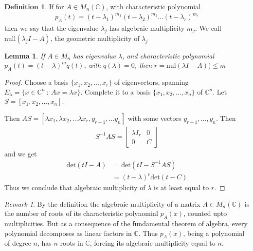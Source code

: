 \documentclass[12pt]{article}
\newtheorem{lemma}[thm]{Lemma}
\theoremstyle{definition}
\newtheorem{defn}[thm]{Definition}
\theoremstyle{remark}
\newtheorem{rem}[thm]{Remark}
\begin{document}
\begin{defn}
  If for $A \in M_n(\mathbb{C})$, with characteristic polynomial
  \begin{align*}
    p_A(t) = (t - \lambda_1)^{m_1} ( t - \lambda_2)^{m_2} \ldots (t -
    \lambda_r)^{m_r}
  \end{align*}
  then we say that the eigenvalue $\lambda_j$ has algebraic
  multiplicity $m_j$. We call $\textrm{null}(\lambda_jI - A)$, the
  geometric multiplicity of $\lambda_j$
\end{defn}

\begin{lemma}
  If $A \in M_n$ has eigenvalue $\lambda$, and characteristic
  polynomial $ p_A(t) = (t - \lambda)^m q(t)$, with $q(\lambda) = 0$,
then $r = \textrm{nul}(\lambda I - A)) \le m$
\end{lemma}
\begin{proof}
Choose a basis $\{ x_1 , x_2 , \ldots , x_r \}$ of eigenvectors,
spanning $E_\lambda = \{ x \in \mathbb{C}^n \ : \ Ax = \lambda x \}$.
Complete it to a basis $\{ x_1 , x_2 , \ldots , x_n \}$ of $
\mathbb{C}^n$. Let $S = [x_1 , x_2 , \ldots , x_n]$.

Then $AS = [ \lambda x_1 , \lambda x_2 , \ldots  \lambda x_r,
y_{r+1}, \ldots y_n]$ with some vectors $y_{r+1} , \ldots , y_n$.
Then
\begin{align*}
  S^{-1}AS =
  \begin{bmatrix}
    \lambda I_r & 0 \\
    0 & C
  \end{bmatrix}
\end{align*}
and we get
\begin{align*}
  \textrm{det}(tI - A) & = \textrm{det}(tI - S^{-1}AS) \\
  &= ( t - \lambda)^r \textrm{det}(t - C)
\end{align*}
Thus we conclude that algebraic multiplicity of $\lambda$ is at least
equal to $r$.
\end{proof}

\begin{rem}
By the definition the algebraic multiplicity of a matrix $A \in
M_n(\mathbb{C})$ is the number of roots of its characteristic
polynomial $p_A(x)$, counted upto multiplicities. But as a
consequence of the fundamental theorem of algebra, every polynomial
decomposes as linear factors in $\mathbb{C}$. Thus $p_A(x)$, being a
polynomial of degree $n$, has $n$ roots in $\mathbb{C}$, forcing its
algebraic multiplicity equal to $n$.
\end{rem}
\end{document}
